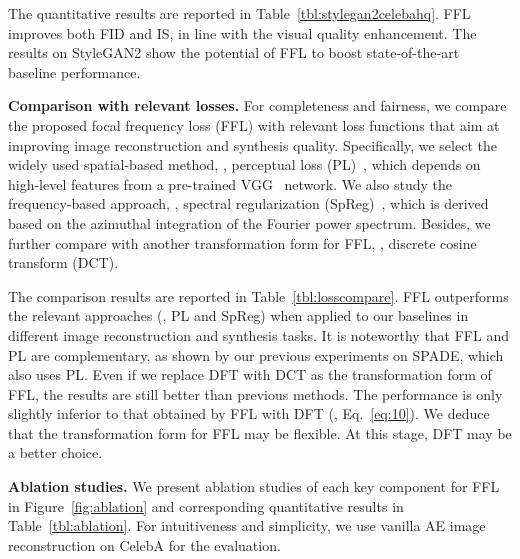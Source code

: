 \documentclass[10pt,twocolumn,letterpaper]{article}
\begin{document}
The quantitative results are reported in Table~\ref{tbl:stylegan2celebahq}. FFL improves both FID and IS, in line with the visual quality enhancement. The results on StyleGAN2 show the potential of FFL to boost state-of-the-art baseline performance.






\vspace{0.05cm}
\noindent
\textbf{Comparison with relevant losses.}
For completeness and fairness, we compare the proposed focal frequency loss (FFL) with relevant loss functions that aim at improving image reconstruction and synthesis quality.
Specifically, we select the widely used spatial-based method, \ie, perceptual loss (PL)~\cite{perceptualloss}, which depends on high-level features from a pre-trained VGG~\cite{vgg} network.
We also study the frequency-based approach, \ie, spectral regularization (SpReg)~\cite{specreg}, which is derived based on the azimuthal integration of the Fourier power spectrum.
Besides, we further compare with another transformation form for FFL, \ie, discrete cosine transform (DCT).

The comparison results are reported in Table~\ref{tbl:losscompare}.
FFL outperforms the relevant approaches (\ie, PL and SpReg) when applied to our baselines in different image reconstruction and synthesis tasks. It is noteworthy that FFL and PL are complementary, as shown by our previous experiments on SPADE, which also uses PL.
Even if we replace DFT with DCT as the transformation form of FFL, the results are still better than previous methods. The performance is only slightly inferior to that obtained by FFL with DFT (\ie, Eq.~\eqref{eq:10}). We deduce that the transformation form for FFL may be flexible. At this stage, DFT may be a better choice.









\vspace{0.05cm}
\noindent
\textbf{Ablation studies.}
We present ablation studies of each key component for FFL in Figure~\ref{fig:ablation} and corresponding quantitative results in Table~\ref{tbl:ablation}.
For intuitiveness and simplicity, we use vanilla AE image reconstruction on CelebA for the evaluation.
\end{document}
